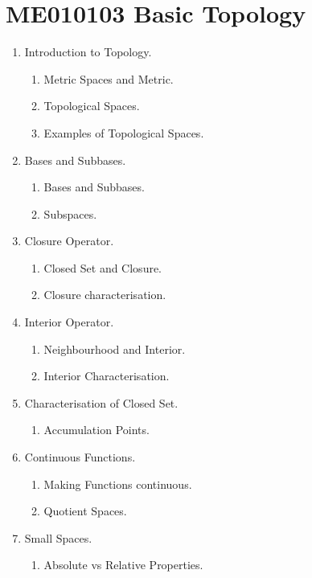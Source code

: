 \chapter{ME010103 Basic Topology}
\begin{enumerate}[label=Topic \arabic*]
	\item Introduction to Topology.
	\begin{enumerate}[label=Session \arabic*]
		\item Metric Spaces and Metric.
		\item Topological Spaces.
		\item Examples of Topological Spaces.
	\end{enumerate}
	\item Bases and Subbases.
	\begin{enumerate}[label=Session \arabic*]
		\item Bases and Subbases.
		\item Subspaces.
	\end{enumerate}
	\item Closure Operator.
	\begin{enumerate}[label=Session \arabic*]
		\item Closed Set and Closure.
		\item Closure characterisation.
	\end{enumerate}
	\item Interior Operator.
	\begin{enumerate}[label=Session \arabic*]
		\item Neighbourhood and Interior.
		\item Interior Characterisation.
	\end{enumerate}
	\item Characterisation of Closed Set.
	\begin{enumerate}[label=Session \arabic*]
		\item Accumulation Points.
	\end{enumerate}
	\item Continuous Functions.
	\begin{enumerate}[label=Session \arabic*]
		\item Making Functions continuous.
		\item Quotient Spaces.
	\end{enumerate}
	\item Small Spaces.
	\begin{enumerate}[label=Session \arabic*]
		\item Absolute vs Relative Properties.

\end{enumerate}
\end{enumerate}
